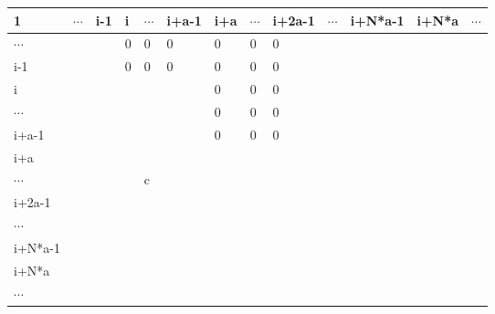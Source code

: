 \documentclass[a4paper,11pt]{article}
\begin{document}
%
\begin{center}
\begin{tabular}{p{15pt}|p{15pt}|p{15pt}||p{15pt}|p{15pt}
|p{15pt}||p{15pt}|p{15pt}|
p{15pt}|p{15pt}|p{15pt}|p{15pt}|p{15pt}| } 
 1 & $\cdots$ & i-1 & i & $\cdots$ & \tiny{i+a-1} & {\tiny i+a } 
& $\cdots$ & {\tiny{i+2a-1} }
& $\cdots$ & {\tiny i+N*a-1} & {\tiny i+N*a} & $\cdots$ \\
\hline
$\cdots$  & \cellcolor{green} & \cellcolor{green} & \cellcolor{sandstorm} 0 & \cellcolor{sandstorm} 0 & \cellcolor{sandstorm} 0 & \cellcolor{sandstorm} 0 & \cellcolor{sandstorm} 0 & \cellcolor{sandstorm} 0 &  &  &  & \\[10pt]
\hline
i-1 & \cellcolor{green} & \cellcolor{green} & \cellcolor{sandstorm} 0 & \cellcolor{sandstorm} 0 & \cellcolor{sandstorm} 0 & \cellcolor{sandstorm} 0 &\cellcolor{sandstorm} 0 & \cellcolor{sandstorm} 0 &  &  &  &  \\ [10pt]
\hline
i & \cellcolor{periwinkle} & \cellcolor{periwinkle} & \cellcolor{pink} & \cellcolor{pink} &\cellcolor{pink} & \cellcolor{sandstorm} 0 &
\cellcolor{sandstorm} 0 &
\cellcolor{sandstorm} 0 &&&& \\ [10pt]
\hline
$\cdots$ & \cellcolor{periwinkle} & \cellcolor{periwinkle}
&\cellcolor{pink} &\cellcolor{pink}&\cellcolor{pink} &
\cellcolor{sandstorm} 0 & \cellcolor{sandstorm} 0 &
\cellcolor{sandstorm} 0 &&&& \\ [10pt]
\hline
i+a-1 &\cellcolor{periwinkle} &\cellcolor{periwinkle} & \cellcolor{pink} & \cellcolor{pink} & \cellcolor{pink} 
& \cellcolor{sandstorm} 0 & \cellcolor{sandstorm} 0 
& \cellcolor{sandstorm} 0 &&&& \\ [10pt]
\hline \hline
{\scriptsize i+a }  & \cellcolor{periwinkle} & \cellcolor{periwinkle} & \cellcolor{trueblue} &\cellcolor{trueblue}
& \cellcolor{trueblue}& \cellcolor{pink} 
&\cellcolor{pink} & \cellcolor{pink} & &&& \\ [10pt]
\hline
$\cdots$ &\cellcolor{periwinkle} &\cellcolor{periwinkle} & \cellcolor{trueblue}  & \cellcolor{trueblue} c & \cellcolor{trueblue} 
& \cellcolor{pink} & \cellcolor{pink} &\cellcolor{pink} 
&&&& \\ [10pt]
\hline
{\small i+2a-1 } &\cellcolor{periwinkle} & \cellcolor{periwinkle} & \cellcolor{trueblue} 
& \cellcolor{trueblue}  & \cellcolor{trueblue}
& \cellcolor{pink} & \cellcolor{pink} & \cellcolor{pink} 
&&&& \\ [10pt]
\hline
$\cdots$ & &&&&&&&&&&&  \\ [10pt]
\hline
{\tiny i+N*a-1 } & &&&&&&&&&&& \\ [10pt]
\hline
{\tiny i+N*a} & &&&&&&&&&&&\\ [10pt]
\hline
$\cdots$ & &&&&&&&&&&&\\ [10pt]
\hline
\end{tabular}
\end{center}
%
%
%
       
\end{document}
